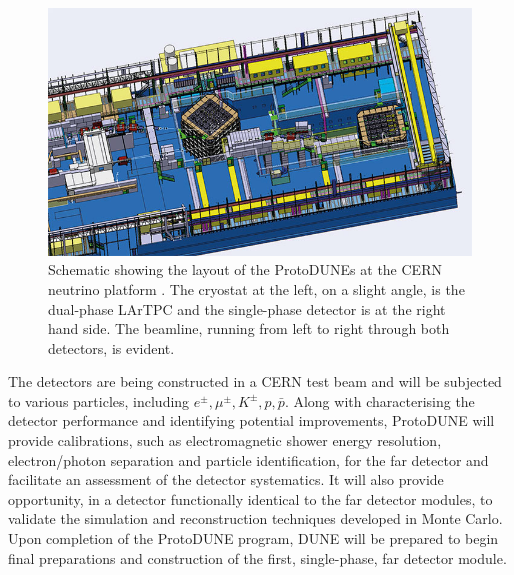 \begin{figure}
  \centering
  \includegraphics[width=14cm]{NeutrinoPlatform.jpg}
  \caption[Schematic showing the layout of the ProtoDUNEs at the CERN neutrino platform.]{Schematic showing the layout of the ProtoDUNEs at the CERN neutrino platform \cite{NeutrinoPlatform}.  The cryostat at the left, on a slight angle, is the dual-phase LArTPC and the single-phase detector is at the right hand side.  The beamline, running from left to right through both detectors, is evident.}
  \label{fig:NeutrinoPlatform}
\end{figure}

The detectors are being constructed in a CERN test beam and will be subjected to various particles, including $e^{\pm}, \mu^{\pm}, K^{\pm}, p, \bar{p}$.  Along with characterising the detector performance and identifying potential improvements, ProtoDUNE will provide calibrations, such as electromagnetic shower energy resolution, electron/photon separation and particle identification, for the far detector and facilitate an assessment of the detector systematics.  It will also provide opportunity, in a detector functionally identical to the far detector modules, to validate the simulation and reconstruction techniques developed in Monte Carlo.  Upon completion of the ProtoDUNE program, DUNE will be prepared to begin final preparations and construction of the first, single-phase, far detector module.

